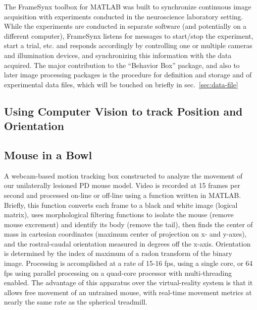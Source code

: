 \documentclass[
  12pt,
]{report}
\numberwithin{figure}{section}
\numberwithin{table}{section}
\numberwithin{equations}{section}
\begin{document}
The FrameSynx toolbox for MATLAB was built to synchronize continuous
image acquisition with experiments conducted in the neuroscience
laboratory setting. While the experiments are conducted in separate
software (and potentially on a different computer), FrameSynx listens
for messages to start/stop the experiment, start a trial, etc. and
responds accordingly by controlling one or multiple cameras and
illumination devices, and synchronizing this information with the data
acquired. The major contribution to the ``Behavior Box'' package, and
also to later image processing packages is the procedure for definition
and storage and of experimental data files, which will be touched on
briefly in sec.~\ref{sec:data-file}

\hypertarget{sec:using-computer-vision-to-track-position-and-orientation}{%
\subsection{Using Computer Vision to track Position and
Orientation}\label{sec:using-computer-vision-to-track-position-and-orientation}}

\hypertarget{mouse-in-a-bowl}{%
\subsection{Mouse in a Bowl}\label{mouse-in-a-bowl}}

A webcam-based motion tracking box constructed to analyze the movement
of our unilaterally lesioned PD mouse model. Video is recorded at 15
frames per second and processed on-line or off-line using a function
written in MATLAB. Briefly, this function converts each frame to a black
and white image (logical matrix), uses morphological filtering functions
to isolate the mouse (remove mouse excrement) and identify its body
(remove the tail), then finds the center of mass in cartesian
coordinates (maximum center of projection on x- and y-axes), and the
rostral-caudal orientation measured in degrees off the x-axis.
Orientation is determined by the index of maximum of a radon transform
of the binary image. Processing is accomplished at a rate of 15-16 fps,
using a single core, or 64 fps using parallel processing on a quad-core
processor with multi-threading enabled. The advantage of this apparatus
over the virtual-reality system is that it allows free movement of an
untrained mouse, with real-time movement metrics at nearly the same rate
as the spherical treadmill.
\end{document}
